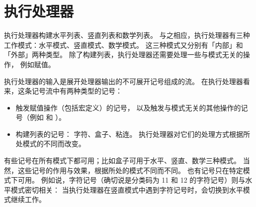 \documentclass{book}
\begin{document}
\section{执行处理器}

执行处理器构建水平列表、竖直列表和数学列表。
与之相应，执行处理器有三种工作模式：水平模式、竖直模式、数学模式。
这三种模式又分别有「内部」和「外部」两种类型。
除了构建列表，执行处理器还需要处理一些与模式无关的操作，
例如赋值。

执行处理器的输入是展开处理器输出的不可展开记号组成的流。
在执行处理器看来，这条记号流中有两种类型的记号：
\begin{itemize}
\item 触发赋值操作（包括宏定义）的记号，
      以及触发与模式无关的其他操作的记号（例如  和 ）。
\item 构建列表的记号：
      字符、盒子、粘连。
      执行处理器对它们的处理方式根据所处模式的不同而改变。
\end{itemize}

有些记号在所有模式下都可用；比如盒子可用于水平、竖直、数学三种模式。
当然，这些记号的作用与效果，根据所处的模式不同而不同。
也有记号只在特定模式下可用。
例如说，字符记号（确切说是分类码为 11 和 12 的字符记号）则与水平模式密切相关：
当执行处理器在竖直模式中遇到字符记号时，会切换到水平模式继续工作。
\end{document}
